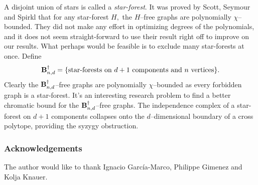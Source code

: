 \documentclass{article}
\theoremstyle{plain}
\theoremstyle{definition}
\begin{document}
A disjoint union of stars is called a \emph{star-forest}. It was proved by Scott, Seymour and Spirkl \cite{sss} that for any star-forest $H,$ the $H$--free graphs are polynomially $\chi$--bounded. They did not make any effort in optimizing degrees of the polynomials, and it does not seem straight-forward to use their result right off to improve on our results. What perhaps would be feasible is to exclude many star-forests at once. Define
\[
{\bf B}_{n,d}^\dagger = \{ \textrm{star-forests on $d+1$ components and $n$ vertices}  \}.
\]
Clearly the ${\bf B}_{n,d}^\dagger$--free graphs are polynomially $\chi$--bounded as every forbidden graph is a star-forest. It's an interesting research problem to find a better chromatic bound for the ${\bf B}_{n,d}^\dagger$--free graphs. The independence complex of a star-forest on $d+1$ components collapses onto the $d$--dimensional boundary of a cross polytope, providing the syzygy obstruction.

\subsubsection*{Acknowledgements}
The author would like to thank Ignacio García-Marco, Philippe Gimenez and Kolja Knauer.
\end{document}

